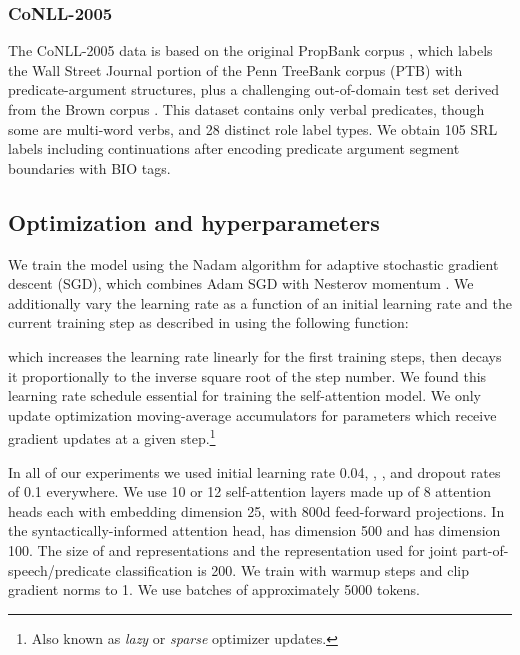 \documentclass[11pt,a4paper]{article}
\begin{document}
\subsubsection{CoNLL-2005}
The CoNLL-2005 data \citep{carreras2005introduction} is based on the original PropBank corpus \citep{palmer2005proposition}, which labels the Wall Street Journal portion of the Penn TreeBank corpus (PTB) \citep{marcus1993building} with predicate-argument structures, plus a challenging out-of-domain test set derived from the Brown corpus \citep{francis1964manual}. This dataset contains only verbal predicates, though some are multi-word verbs, and 28 distinct role label types. We obtain 105 SRL labels including continuations after encoding predicate argument segment boundaries with BIO tags.

\subsection{Optimization and hyperparameters}
We train the model using the Nadam \citep{dozat2016incorporating} algorithm for adaptive stochastic gradient descent (SGD), which combines Adam \citep{kingma2014adam} SGD with Nesterov momentum \citep{nesterov1983method}. We additionally vary the learning rate  as a function of an initial learning rate  and the current training step  as described in \citet{vaswani2017attention} using the following function:

which increases the learning rate linearly for the first  training steps, then decays it proportionally to the inverse square root of the step number. We found this learning rate schedule essential for training the self-attention model. We only update optimization moving-average accumulators for parameters which receive gradient updates at a given step.\footnote{Also known as \emph{lazy} or \emph{sparse} optimizer updates.}

In all of our experiments we used initial learning rate 0.04, , ,  and dropout rates of 0.1 everywhere. We use 10 or 12 self-attention layers made up of 8 attention heads each with embedding dimension 25, with 800d feed-forward projections. In the syntactically-informed attention head,  has dimension 500 and  has dimension 100. The size of  and  representations and the representation used for joint part-of-speech/predicate classification is 200. We train with  warmup steps and clip gradient norms to 1. We use batches of approximately 5000 tokens.
\end{document}
